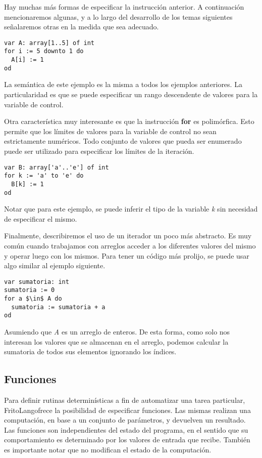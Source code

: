 \documentclass{article}
\newcommand{\Lang}{FritoLang} %
\begin{document}
Hay muchas más formas de especificar la instrucción anterior.
A continuación mencionaremos algunas, y a lo largo del desarrollo de los temas siguientes señalaremos otras en la medida que sea adecuado.

\begin{lstlisting}
var A: array[1..5] of int
for i := 5 downto 1 do
  A[i] := 1
od
\end{lstlisting}

La semántica de este ejemplo es la misma a todos los ejemplos anteriores.
La particularidad es que se puede especificar un rango descendente de valores para la variable de control.

Otra característica muy interesante es que la instrucción \textbf{for} es polimórfica.
Esto permite que los límites de valores para la variable de control no sean estrictamente numéricos.
Todo conjunto de valores que pueda ser enumerado puede ser utilizado para especificar los límites de la iteración.

\begin{lstlisting}
var B: array['a'..'e'] of int
for k := 'a' to 'e' do
  B[k] := 1
od
\end{lstlisting}

Notar que para este ejemplo, se puede inferir el tipo de la variable \textit{k} sin necesidad de especificar el mismo.

Finalmente, describiremos el uso de un iterador un poco más abstracto.
Es muy común cuando trabajamos con arreglos acceder a los diferentes valores del mismo y operar luego con los mismos.
Para tener un código más prolijo, se puede usar algo similar al ejemplo siguiente.

\begin{lstlisting}
var sumatoria: int
sumatoria := 0
for a $\in$ A do
  sumatoria := sumatoria + a
od
\end{lstlisting}

Asumiendo que \textit{A} es un arreglo de enteros.
De esta forma, como solo nos interesan los valores que se almacenan en el arreglo, podemos calcular la sumatoria de todos sus elementos ignorando los índices.

\subsection{Funciones}
Para definir rutinas determinísticas a fin de automatizar una tarea particular, \Lang\space ofrece la posibilidad de especificar funciones.
Las mismas realizan una computación, en base a un conjunto de parámetros, y devuelven un resultado.
Las funciones son independientes del estado del programa, en el sentido que su comportamiento es determinado por los valores de entrada que recibe.
También es importante notar que no modifican el estado de la computación.
\end{document}
